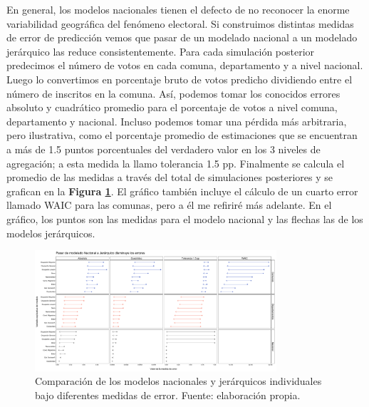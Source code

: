 En general, los modelos nacionales tienen el defecto de no reconocer la enorme variabilidad geográfica del fenómeno electoral. Si construimos distintas medidas de error de predicción vemos que pasar de un modelado nacional a un modelado jerárquico las reduce consistentemente. Para cada simulación posterior predecimos el número de votos en cada comuna, departamento y a nivel nacional. Luego lo convertimos en porcentaje bruto de votos predicho dividiendo entre el número de inscritos en la comuna. Así, podemos tomar los conocidos errores absoluto y cuadrático promedio para el porcentaje de votos a nivel comuna, departamento y nacional. Incluso podemos tomar una pérdida más arbitraria, pero ilustrativa, como el porcentaje promedio de estimaciones que se encuentran a más de 1.5 puntos porcentuales del verdadero valor en los 3 niveles de agregación; a esta medida la llamo tolerancia 1.5 pp. Finalmente se calcula el promedio de las medidas a través del total de simulaciones posteriores y se grafican en la \textbf{Figura \ref{fig:Errores_Modelos_Individuales}}. El gráfico también incluye el cálculo de un cuarto error llamado WAIC para las comunas, pero a él me refiriré más adelante. En el gráfico, los puntos son las medidas para el modelo nacional y las flechas las de los modelos jerárquicos.\\ 

\begin{figure}[h]
	\centering
	\includegraphics[width = 0.8\textwidth]{Figs/Modelado/Graf_Errores_Modelos_Individuales}
	\caption{Comparación de los modelos nacionales y jerárquicos individuales bajo diferentes medidas de error. Fuente: elaboración propia.}
	\label{fig:Errores_Modelos_Individuales}
\end{figure} 

